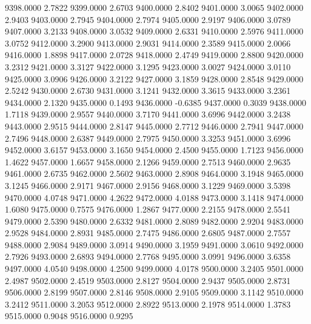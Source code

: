 9398.0000      2.7822
9399.0000      2.6703
9400.0000      2.8402
9401.0000      3.0065
9402.0000      2.9403
9403.0000      2.7945
9404.0000      2.7974
9405.0000      2.9197
9406.0000      3.0789
9407.0000      3.2133
9408.0000      3.0532
9409.0000      2.6331
9410.0000      2.5976
9411.0000      3.0752
9412.0000      3.2900
9413.0000      2.9031
9414.0000      2.3589
9415.0000      2.0066
9416.0000      1.8898
9417.0000      2.0728
9418.0000      2.4749
9419.0000      2.8800
9420.0000      3.2312
9421.0000      3.3127
9422.0000      3.1295
9423.0000      3.0027
9424.0000      3.0110
9425.0000      3.0906
9426.0000      3.2122
9427.0000      3.1859
9428.0000      2.8548
9429.0000      2.5242
9430.0000      2.6730
9431.0000      3.1241
9432.0000      3.3615
9433.0000      3.2361
9434.0000      2.1320
9435.0000      0.1493
9436.0000     -0.6385
9437.0000      0.3039
9438.0000      1.7118
9439.0000      2.9557
9440.0000      3.7170
9441.0000      3.6996
9442.0000      3.2438
9443.0000      2.9515
9444.0000      2.8147
9445.0000      2.7712
9446.0000      2.7941
9447.0000      2.7496
9448.0000      2.6387
9449.0000      2.7975
9450.0000      3.3253
9451.0000      3.6996
9452.0000      3.6157
9453.0000      3.1650
9454.0000      2.4500
9455.0000      1.7123
9456.0000      1.4622
9457.0000      1.6657
9458.0000      2.1266
9459.0000      2.7513
9460.0000      2.9635
9461.0000      2.6735
9462.0000      2.5602
9463.0000      2.8908
9464.0000      3.1948
9465.0000      3.1245
9466.0000      2.9171
9467.0000      2.9156
9468.0000      3.1229
9469.0000      3.5398
9470.0000      4.0748
9471.0000      4.2622
9472.0000      4.0188
9473.0000      3.1418
9474.0000      1.6080
9475.0000      0.7575
9476.0000      1.2867
9477.0000      2.2155
9478.0000      2.5541
9479.0000      2.5390
9480.0000      2.6332
9481.0000      2.8089
9482.0000      2.9204
9483.0000      2.9528
9484.0000      2.8931
9485.0000      2.7475
9486.0000      2.6805
9487.0000      2.7557
9488.0000      2.9084
9489.0000      3.0914
9490.0000      3.1959
9491.0000      3.0610
9492.0000      2.7926
9493.0000      2.6893
9494.0000      2.7768
9495.0000      3.0991
9496.0000      3.6358
9497.0000      4.0540
9498.0000      4.2500
9499.0000      4.0178
9500.0000      3.2405
9501.0000      2.4987
9502.0000      2.4519
9503.0000      2.8127
9504.0000      2.9437
9505.0000      2.8731
9506.0000      2.8199
9507.0000      2.8146
9508.0000      2.9105
9509.0000      3.1142
9510.0000      3.2412
9511.0000      3.2053
9512.0000      2.8922
9513.0000      2.1978
9514.0000      1.3783
9515.0000      0.9048
9516.0000      0.9295
